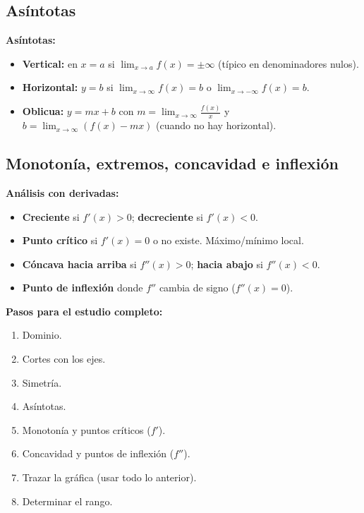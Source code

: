\documentclass[12pt, letterpaper]{article}
\begin{document}
\subsection{Asíntotas}

\begin{cuadroteoria}
  \textbf{Asíntotas:}
  \begin{itemize}
    \item \textbf{Vertical:} en $x = a$ si $\lim_{x\to a}f(x) = \pm\infty$ (típico en denominadores nulos).
    \item \textbf{Horizontal:} $y = b$ si $\lim_{x\to\infty} f(x) = b$ o $\lim_{x\to-\infty}f(x) = b$.
    \item \textbf{Oblicua:} $y = mx + b$ con $m = \lim_{x\to\infty}\frac{f(x)}{x}$ y $b = \lim_{x\to\infty}(f(x) - mx)$ (cuando no hay horizontal).
  \end{itemize}
\end{cuadroteoria}

\subsection{Monotonía, extremos, concavidad e inflexión}

\begin{cuadroteoria}
  \textbf{Análisis con derivadas:}
  \begin{itemize}
    \item \textbf{Creciente} si $f'(x) > 0$; \textbf{decreciente} si $f'(x) < 0$.
    \item \textbf{Punto crítico} si $f'(x) = 0$ o no existe. Máximo/mínimo local.
    \item \textbf{Cóncava hacia arriba} si $f''(x) > 0$; \textbf{hacia abajo} si $f''(x) < 0$.
    \item \textbf{Punto de inflexión} donde $f''$ cambia de signo ($f''(x) = 0$).
  \end{itemize}
\end{cuadroteoria}

\begin{cuadropasos}
  \textbf{Pasos para el estudio completo:}
  \begin{enumerate}
    \item Dominio.
    \item Cortes con los ejes.
    \item Simetría.
    \item Asíntotas.
    \item Monotonía y puntos críticos ($f'$).
    \item Concavidad y puntos de inflexión ($f''$).
    \item Trazar la gráfica (usar todo lo anterior).
    \item Determinar el rango.
  \end{enumerate}
\end{cuadropasos}
\end{document}
